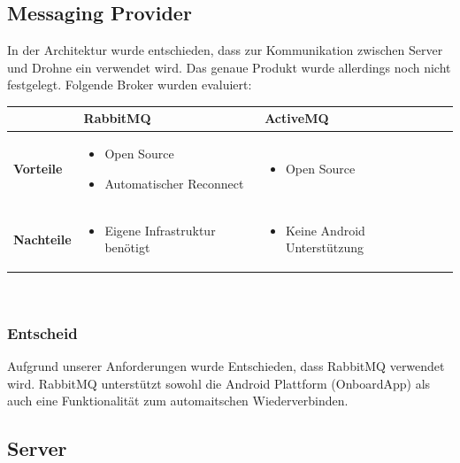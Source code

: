 \subsection{Messaging Provider}
In der Architektur wurde entschieden, dass zur Kommunikation zwischen Server und Drohne ein \cite{Message-Broker} verwendet wird. Das genaue Produkt wurde allerdings noch nicht festgelegt. Folgende Broker wurden evaluiert:  \\
\begin{tabularx}{\textwidth}{|l|X|X|X|}
	\hline
	&\textbf{RabbitMQ} & \textbf{ActiveMQ} \\
	\hline
	\textbf{Vorteile} & 
	\begin{itemize}[noitemsep, topsep=1pt, leftmargin=15pt] \item{Open Source} \item{Automatischer  \mbox{Reconnect}} \end{itemize}  &
	\begin{itemize}[noitemsep, topsep=1pt, leftmargin=15pt] \item{Open Source} \end{itemize} \\
	
	\hline 
	
	
	\textbf{Nachteile} & 
	\begin{itemize}[noitemsep, topsep=1pt, leftmargin=15pt] \item{Eigene Infrastruktur benötigt} \end{itemize}  &
	\begin{itemize}[noitemsep, topsep=1pt, leftmargin=15pt] \item{Keine Android Unterstützung} \end{itemize} \\

	\hline 
\end{tabularx} \\

\subsubsection{Entscheid}
Aufgrund unserer Anforderungen wurde Entschieden, dass RabbitMQ verwendet wird. RabbitMQ unterstützt sowohl die Android Plattform (OnboardApp) als auch eine Funktionalität zum automaitschen Wiederverbinden.

\subsection{Server}

